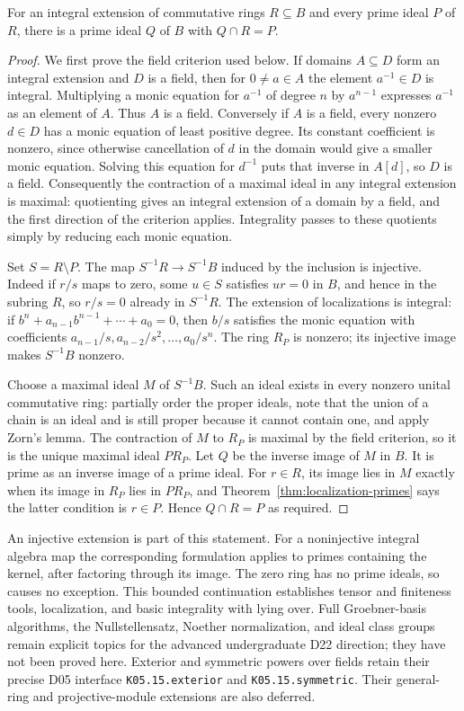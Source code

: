 \begin{theorem}\label{thm:lying-over}
For an integral extension of commutative rings $R\subseteq B$ and every
prime ideal $P$ of $R$, there is a prime ideal $Q$ of $B$ with
$Q\cap R=P$.
\end{theorem}
\begin{proof}
We first prove the field criterion used below. If domains $A\subseteq D$
form an integral extension and $D$ is a field, then for $0\ne a\in A$
the element $a^{-1}\in D$ is integral. Multiplying a monic equation
for $a^{-1}$ of degree $n$ by $a^{n-1}$ expresses $a^{-1}$ as an
element of $A$. Thus $A$ is a field. Conversely if $A$ is a field,
every nonzero $d\in D$ has a monic equation of least positive degree.
Its constant coefficient is nonzero, since otherwise cancellation
of $d$ in the domain would give a smaller monic equation.
Solving this equation for $d^{-1}$ puts that inverse in $A[d]$,
so $D$ is a field.
Consequently the contraction of a maximal ideal in any integral
extension is maximal: quotienting gives an integral extension of a
domain by a field, and the first direction of the criterion applies.
Integrality passes to these quotients simply by reducing each monic
equation.

Set $S=R\setminus P$. The map $S^{-1}R\to S^{-1}B$ induced by the
inclusion is injective. Indeed if $r/s$ maps to zero, some $u\in S$
satisfies $ur=0$ in $B$, and hence in the subring $R$, so $r/s=0$
already in $S^{-1}R$. The extension of localizations is integral:
if $b^n+a_{n-1}b^{n-1}+\cdots+a_0=0$, then $b/s$ satisfies the
monic equation with coefficients
$a_{n-1}/s,a_{n-2}/s^2,\ldots,a_0/s^n$.
The ring $R_P$ is nonzero; its injective image makes $S^{-1}B$ nonzero.

Choose a maximal ideal $M$ of $S^{-1}B$.
Such an ideal exists in every nonzero unital commutative ring:
partially order the proper ideals, note that the union of a chain is
an ideal and is still proper because it cannot contain one, and apply
Zorn's lemma. The contraction of $M$ to $R_P$ is maximal by the field
criterion, so it is the unique maximal ideal $PR_P$.
Let $Q$ be the inverse image of $M$ in $B$.
It is prime as an inverse image of a prime ideal.
For $r\in R$, its image lies in $M$ exactly when its image in $R_P$
lies in $PR_P$, and Theorem~\ref{thm:localization-primes} says the latter
condition is $r\in P$. Hence $Q\cap R=P$ as required.
\end{proof}
An injective extension is part of this statement. For a noninjective
integral algebra map the corresponding formulation applies to primes
containing the kernel, after factoring through its image.
The zero ring has no prime ideals, so causes no exception.
This bounded continuation establishes tensor and finiteness tools,
localization, and basic integrality with lying over. Full Groebner-basis
algorithms, the Nullstellensatz, Noether normalization, and ideal class
groups remain explicit topics for the advanced undergraduate D22
direction; they have not been proved here. Exterior and symmetric
powers over fields retain their precise D05 interface
\texttt{K05.15.exterior} and \texttt{K05.15.symmetric}.
Their general-ring and projective-module extensions are also deferred.

